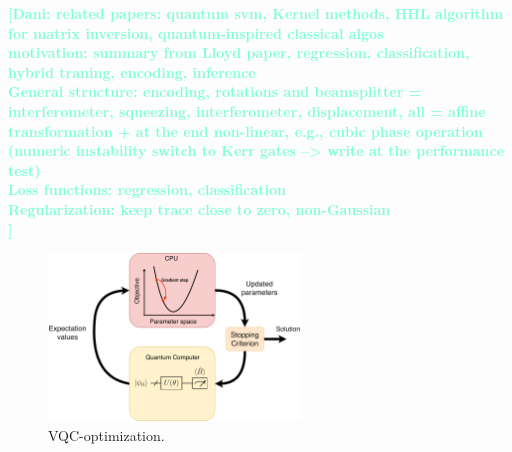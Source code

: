 \documentclass[12pt, a4paper,  nobibnotes]{article}
\newcommand{\nd}[1]{\textcolor{Aquamarine}{\textbf{[Dani: #1]}}}
\begin{document}
\nd{related papers: quantum svm, Kernel methods, HHL algorithm for matrix inversion, quantum-inspired classical algos\\
motivation: summary from Lloyd paper, regression, classification, hybrid traning, encoding, inference\\
General structure: encoding, rotations and beamsplitter = interferometer, squeezing, interferometer, displacement, all = affine transformation + at the end non-linear, e.g., cubic phase operation (numeric instability switch to Kerr gates --> write at the performance test)  \\
Loss functions: regression, classification\\
Regularization: keep trace close to zero, non-Gaussian\\
}
\begin{figure}[H]
    \centering
    \includegraphics[width=0.6\textwidth]{figures/VQC-optimization.png}
    \caption{VQC-optimization.}
    \label{fig:VQC-optimization}
\end{figure}
\end{document}
